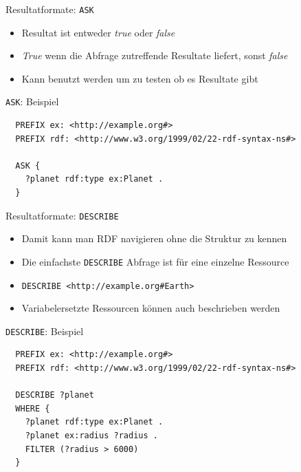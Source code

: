 \documentclass{beamer}
\begin{document}
\begin{frame}{Resultatformate: \texttt{ASK}}
	
	\begin{itemize}
		\item Resultat ist entweder \emph{true} oder \emph{false}
		\item \emph{True} wenn die Abfrage zutreffende Resultate liefert, sonst \emph{false}
		\item Kann benutzt werden um zu testen ob es Resultate gibt
	\end{itemize}
	
\end{frame}

\begin{frame}[fragile]{\texttt{ASK}: Beispiel}
	
	\small
	\begin{lstlisting}
  PREFIX ex: <http://example.org#> 
  PREFIX rdf: <http://www.w3.org/1999/02/22-rdf-syntax-ns#>
	
  ASK {
    ?planet rdf:type ex:Planet .
  }
	\end{lstlisting}
	
\end{frame}

\begin{frame}{Resultatformate: \texttt{DESCRIBE}}
	
	\begin{itemize}
		\item Damit kann man RDF navigieren ohne die Struktur zu kennen
		\item Die einfachste \texttt{DESCRIBE} Abfrage ist für eine einzelne Ressource
		\item \texttt{DESCRIBE <http://example.org\#Earth>} 
		\item Variabelersetzte Ressourcen können auch beschrieben werden
	\end{itemize}
	
\end{frame}

\begin{frame}[fragile]{\texttt{DESCRIBE}: Beispiel}
	
	\small
	\begin{lstlisting}
  PREFIX ex: <http://example.org#> 
  PREFIX rdf: <http://www.w3.org/1999/02/22-rdf-syntax-ns#>
	
  DESCRIBE ?planet 
  WHERE {
    ?planet rdf:type ex:Planet .
    ?planet ex:radius ?radius .
    FILTER (?radius > 6000)
  }
	\end{lstlisting}
	
\end{frame}
\end{document}
